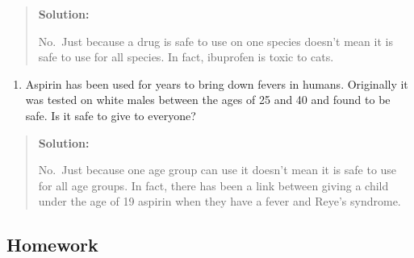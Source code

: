 \documentclass[]{book}
\providecommand{\tightlist}{%
  \setlength{\itemsep}{0pt}\setlength{\parskip}{0pt}}
\begin{document}
\begin{quote}
\textbf{Solution:}

No.~Just because a drug is safe to use on one species doesn't mean it
is safe to use for all species. In fact, ibuprofen is toxic to cats.
\end{quote}

\begin{enumerate}
\def\labelenumi{\alph{enumi}.}
\setcounter{enumi}{1}
\tightlist
\item
  Aspirin has been used for years to bring down fevers in humans.
  Originally it was tested on white males between the ages of 25 and
  40 and found to be safe. Is it safe to give to everyone?
\end{enumerate}

\begin{quote}
\textbf{Solution:}

No.~Just because one age group can use it doesn't mean it is safe to
use for all age groups. In fact, there has been a link between giving
a child under the age of 19 aspirin when they have a fever and Reye's
syndrome.
\end{quote}

\hypertarget{homework-3}{%
\subsection{Homework}\label{homework-3}}
\end{document}
